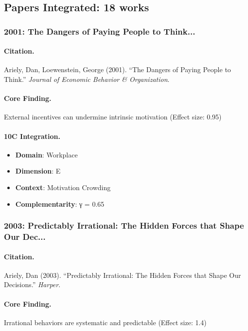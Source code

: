 \subsection{Papers Integrated: 18 works}

\subsubsection{2001: The Dangers of Paying People to Think...}

\paragraph{Citation.}
Ariely, Dan, Loewenstein, George (2001). ``The Dangers of Paying People to Think.''
\textit{Journal of Economic Behavior & Organization}.

\paragraph{Core Finding.}
External incentives can undermine intrinsic motivation (Effect size: 0.95)

\paragraph{10C Integration.}
\begin{itemize}[nosep]
  \item \textbf{Domain}: Workplace
  \item \textbf{Dimension}: E
  \item \textbf{Context}: Motivation Crowding
  \item \textbf{Complementarity}: γ = 0.65
\end{itemize}

\subsubsection{2003: Predictably Irrational: The Hidden Forces that Shape Our Dec...}

\paragraph{Citation.}
Ariely, Dan (2003). ``Predictably Irrational: The Hidden Forces that Shape Our Decisions.''
\textit{Harper}.

\paragraph{Core Finding.}
Irrational behaviors are systematic and predictable (Effect size: 1.4)

